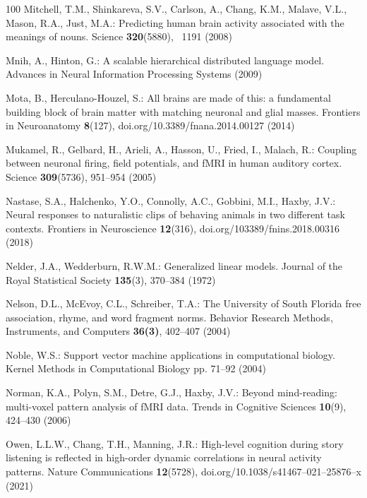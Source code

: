\documentclass{llmxive}
\begin{document}
\begin{thebibliography}{100}
Mitchell, T.M., Shinkareva, S.V., Carlson, A., Chang, K.M., Malave, V.L.,
  Mason, R.A., Just, M.A.: Predicting human brain activity associated with the
  meanings of nouns. Science  \textbf{320}(5880), ~1191 (2008)

Mnih, A., Hinton, G.: A scalable hierarchical distributed language model.
  Advances in Neural Information Processing Systems  (2009)

Mota, B., Herculano-Houzel, S.: All brains are made of this: a fundamental
  building block of brain matter with matching neuronal and glial masses.
  Frontiers in Neuroanatomy  \textbf{8}(127),  doi.org/10.3389/fnana.2014.00127
  (2014)

Mukamel, R., Gelbard, H., Arieli, A., Hasson, U., Fried, I., Malach, R.:
  Coupling between neuronal firing, field potentials, and {fMRI} in human
  auditory cortex. Science  \textbf{309}(5736),  951--954 (2005)

Nastase, S.A., Halchenko, Y.O., Connolly, A.C., Gobbini, M.I., Haxby, J.V.:
  Neural responses to naturalistic clips of behaving animals in two different
  task contexts. Frontiers in Neuroscience  \textbf{12}(316),
  doi.org/103389/fnins.2018.00316 (2018)

Nelder, J.A., Wedderburn, R.W.M.: Generalized linear models. Journal of the
  Royal Statistical Society  \textbf{135}(3),  370--384 (1972)

Nelson, D.L., McEvoy, C.L., Schreiber, T.A.: The {U}niversity of {S}outh
  {F}lorida free association, rhyme, and word fragment norms. Behavior Research
  Methods, Instruments, and Computers  \textbf{36(3)},  402--407 (2004)

Noble, W.S.: Support vector machine applications in computational biology.
  Kernel Methods in Computational Biology pp. 71--92 (2004)

Norman, K.A., Polyn, S.M., Detre, G.J., Haxby, J.V.: Beyond mind-reading:
  multi-voxel pattern analysis of {fMRI} data. Trends in Cognitive Sciences
  \textbf{10}(9),  424--430 (2006)

Owen, L.L.W., Chang, T.H., Manning, J.R.: High-level cognition during story
  listening is reflected in high-order dynamic correlations in neural activity
  patterns. Nature Communications  \textbf{12}(5728),
  doi.org/10.1038/s41467--021--25876--x (2021)


\end{thebibliography}
\end{document}
